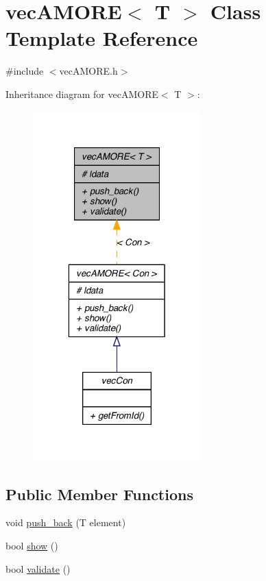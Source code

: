 \hypertarget{classvec_a_m_o_r_e}{
\section{vecAMORE$<$ T $>$ Class Template Reference}
\label{classvec_a_m_o_r_e}
}


{\ttfamily \#include $<$vecAMORE.h$>$}



Inheritance diagram for vecAMORE$<$ T $>$:\nopagebreak
\begin{figure}[H]
\begin{center}
\leavevmode
\includegraphics[width=184pt]{classvec_a_m_o_r_e__inherit__graph}
\end{center}
\end{figure}
\subsection*{Public Member Functions}
\begin{DoxyCompactItemize}
\item 
void \hyperlink{classvec_a_m_o_r_e_a2472d46a111328c069cdb48e7e41109b}{push\_\-back} (T element)
\item 
bool \hyperlink{classvec_a_m_o_r_e_a11b0ffb0d2481f1960cb49a26b227d37}{show} ()
\item 
bool \hyperlink{classvec_a_m_o_r_e_a247aaafe9115cc433fc3be297c1f568e}{validate} ()
\end{DoxyCompactItemize}
